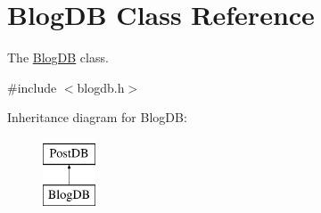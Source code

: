 \hypertarget{classBlogDB}{}\section{Blog\+DB Class Reference}
\label{classBlogDB}


The \hyperlink{classBlogDB}{Blog\+DB} class.  




{\ttfamily \#include $<$blogdb.\+h$>$}

Inheritance diagram for Blog\+DB\+:\begin{figure}[H]
\begin{center}
\leavevmode
\includegraphics[height=2.000000cm]{classBlogDB}
\end{center}
\end{figure}

